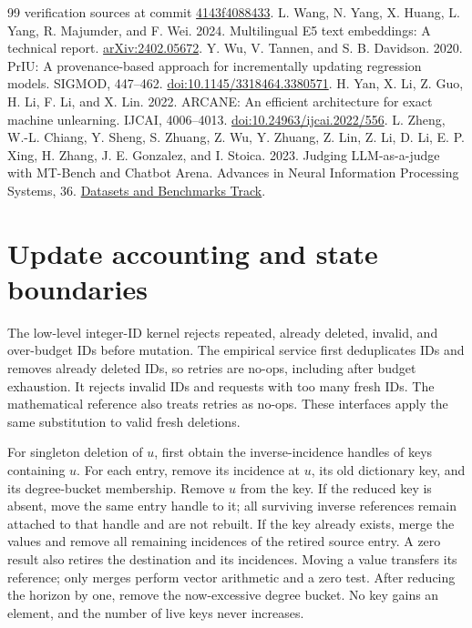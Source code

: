\begin{thebibliography}{99}
verification sources at commit
\href{https://github.com/PranayTadakamalla/predictive-state-not-explanatory-state/tree/4143f408843394e21a0622c9eb5d5de10a687a8c}{4143f4088433}.
 L. Wang, N. Yang, X. Huang, L. Yang, R. Majumder, and F. Wei.
2024. Multilingual E5 text embeddings: A technical report.
\href{https://arxiv.org/abs/2402.05672}{arXiv:2402.05672}.
 Y. Wu, V. Tannen, and S. B. Davidson. 2020.
PrIU: A provenance-based approach for incrementally updating regression
models. SIGMOD, 447--462.
\href{https://doi.org/10.1145/3318464.3380571}{doi:10.1145/3318464.3380571}.
 H. Yan, X. Li, Z. Guo, H. Li, F. Li, and X. Lin. 2022.
ARCANE: An efficient architecture for exact machine unlearning. IJCAI,
4006--4013. \href{https://doi.org/10.24963/ijcai.2022/556}{doi:10.24963/ijcai.2022/556}.
 L. Zheng, W.-L. Chiang, Y. Sheng, S. Zhuang,
Z. Wu, Y. Zhuang, Z. Lin, Z. Li, D. Li, E. P. Xing, H. Zhang,
J. E. Gonzalez, and I. Stoica. 2023. Judging LLM-as-a-judge with MT-Bench
and Chatbot Arena. Advances in Neural Information Processing Systems, 36.
\href{https://proceedings.nips.cc/paper_files/paper/2023/hash/91f18a1287b398d378ef22505bf41832-Abstract-Datasets_and_Benchmarks.html}{Datasets and Benchmarks Track}.
\end{thebibliography}

\appendix
\section{Update accounting and state boundaries}\label{app:work}
The low-level integer-ID kernel rejects repeated, already deleted, invalid,
and over-budget IDs before mutation. The empirical service first
deduplicates IDs and removes already deleted IDs, so retries are no-ops,
including after budget exhaustion. It rejects invalid IDs and requests
with too many fresh IDs. The mathematical reference also treats retries as
no-ops. These interfaces apply the same substitution to valid fresh
deletions.

For singleton deletion of $u$, first obtain the inverse-incidence handles
of keys containing $u$. For each entry, remove its incidence at $u$, its
old dictionary key, and its degree-bucket membership. Remove $u$ from
the key. If the reduced key is absent, move the same entry handle to it;
all surviving inverse references remain attached to that handle and are
not rebuilt. If the key already exists, merge the values and remove all
remaining incidences of the retired source entry. A zero result also
retires the destination and its incidences. Moving a value transfers its
reference; only merges perform vector arithmetic and a zero test. After
reducing the horizon by one, remove the now-excessive degree bucket.
No key gains an element, and the number of live keys never increases.

